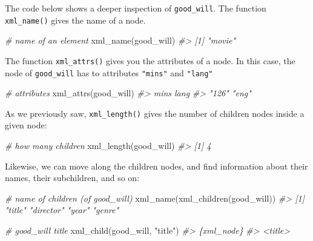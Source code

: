 \documentclass[
]{book}
\newenvironment{Shaded}{\begin{snugshade}}{\end{snugshade}}
\newcommand{\CommentTok}[1]{\textcolor[rgb]{0.56,0.35,0.01}{\textit{#1}}}
\newcommand{\FunctionTok}[1]{\textcolor[rgb]{0.00,0.00,0.00}{#1}}
\newcommand{\NormalTok}[1]{#1}
\newcommand{\StringTok}[1]{\textcolor[rgb]{0.31,0.60,0.02}{#1}}
\begin{document}
The code below shows a deeper inspection of \texttt{good\_will}. The function
\texttt{xml\_name()} gives the name of a node.

\begin{Shaded}
\begin{Highlighting}[]
\CommentTok{\# name of an element}
\FunctionTok{xml\_name}\NormalTok{(good\_will)}
\CommentTok{\#\textgreater{} [1] "movie"}
\end{Highlighting}
\end{Shaded}

The function \texttt{xml\_attrs()} gives you the attributes of a node. In this case,
the node of \texttt{good\_will} has to attributes \texttt{"mins"} and \texttt{"lang"}

\begin{Shaded}
\begin{Highlighting}[]
\CommentTok{\# attributes}
\FunctionTok{xml\_attrs}\NormalTok{(good\_will)}
\CommentTok{\#\textgreater{}  mins  lang }
\CommentTok{\#\textgreater{} "126" "eng"}
\end{Highlighting}
\end{Shaded}

As we previously saw, \texttt{xml\_length()} gives the number of children nodes inside
a given node:

\begin{Shaded}
\begin{Highlighting}[]
\CommentTok{\# how many children}
\FunctionTok{xml\_length}\NormalTok{(good\_will)}
\CommentTok{\#\textgreater{} [1] 4}
\end{Highlighting}
\end{Shaded}

Likewise, we can move along the children nodes, and find information about
their names, their subchildren, and so on:

\begin{Shaded}
\begin{Highlighting}[]
\CommentTok{\# name of children (of good\_will)}
\FunctionTok{xml\_name}\NormalTok{(}\FunctionTok{xml\_children}\NormalTok{(good\_will))}
\CommentTok{\#\textgreater{} [1] "title"    "director" "year"     "genre"}

\CommentTok{\# good\_will title}
\FunctionTok{xml\_child}\NormalTok{(good\_will, }\StringTok{"title"}\NormalTok{)}
\CommentTok{\#\textgreater{} \{xml\_node\}}
\CommentTok{\#\textgreater{} \textless{}title\textgreater{}}
\end{Highlighting}
\end{Shaded}
\end{document}
